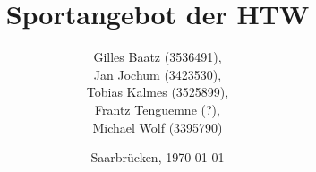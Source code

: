 \begin{titlepage}

	\titlehead
	{
		\hfill
		\texttt{[image: images/logos/HTW.png]}
		\hfill
	}
	
	\subject
	{
		\Huge Dokumentation\\
		\normalsize Semantische Interoperabilit\"at\\
	}
	
	\title
	{
		Sportangebot der HTW
	}
	
	\author
	{		
		Gilles Baatz (3536491),\\
		Jan Jochum (3423530),\\
		Tobias Kalmes (3525899),\\
		Frantz Tenguemne (?),\\
		Michael Wolf (3395790)		
	}
	
	\date
	{
		\normalsize{Saarbrücken, \today}
	}	
	\maketitle	
\end{titlepage}